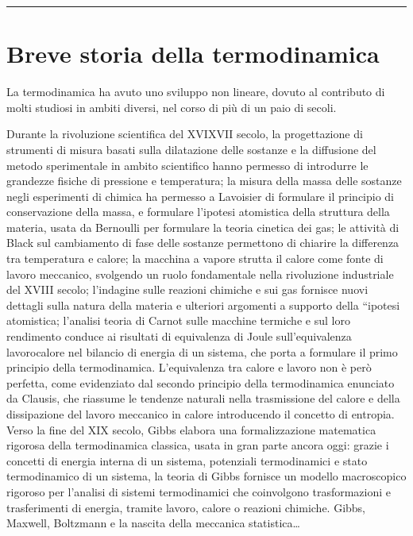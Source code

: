 \documentclass[letterpaper,10pt,italian]{jupyterBook}
\begin{document}
\bigskip\hrule\bigskip


\sphinxstepscope


\section{Breve storia della termodinamica}
\label{\detokenize{ch/thermodynamics/foundation-history:breve-storia-della-termodinamica}}\label{\detokenize{ch/thermodynamics/foundation-history:physics-hs-thermodynamics-foundation-history}}\label{\detokenize{ch/thermodynamics/foundation-history::doc}}
\sphinxAtStartPar
La termodinamica ha avuto uno sviluppo non lineare, dovuto al contributo di molti studiosi in ambiti diversi, nel corso di più di un paio di secoli.

\sphinxAtStartPar
{}
Durante la rivoluzione scientifica del XVI\sphinxhyphen{}XVII secolo, la progettazione di strumenti di misura basati sulla dilatazione delle sostanze e la diffusione del metodo sperimentale in ambito scientifico hanno permesso di introdurre le grandezze fisiche di pressione e temperatura; la misura della massa delle sostanze negli esperimenti di chimica ha permesso a Lavoisier di formulare il principio di conservazione della massa, e formulare l’ipotesi atomistica della struttura della materia, usata da Bernoulli per formulare la teoria cinetica dei gas; le attività di Black sul cambiamento di fase delle sostanze permettono di chiarire la differenza tra temperatura e calore; la macchina a vapore strutta il calore come fonte di lavoro meccanico, svolgendo un ruolo fondamentale nella rivoluzione industriale del XVIII secolo; l’indagine sulle reazioni chimiche e sui gas fornisce nuovi dettagli sulla natura della materia e ulteriori argomenti a supporto della “ipotesi atomistica; l’analisi teoria di Carnot sulle macchine termiche e sul loro rendimento conduce ai risultati di equivalenza di Joule sull’equivalenza lavoro\sphinxhyphen{}calore nel bilancio di energia di un sistema, che porta a formulare il primo principio della termodinamica. L’equivalenza tra calore e lavoro non è però perfetta, come evidenziato dal secondo principio della termodinamica enunciato da Clausis, che riassume le tendenze naturali nella trasmissione del calore e della dissipazione del lavoro meccanico in calore introducendo il concetto di entropia. Verso la fine del XIX secolo, Gibbs elabora una formalizzazione matematica rigorosa della termodinamica classica, usata in gran parte ancora oggi: grazie i concetti di energia interna di un sistema, potenziali termodinamici e stato termodinamico di un sistema, la teoria di Gibbs fornisce un modello macroscopico rigoroso per l’analisi di sistemi termodinamici che coinvolgono trasformazioni e trasferimenti di energia, tramite lavoro, calore o reazioni chimiche.
Gibbs, Maxwell, Boltzmann e la nascita della meccanica statistica…
\end{document}
